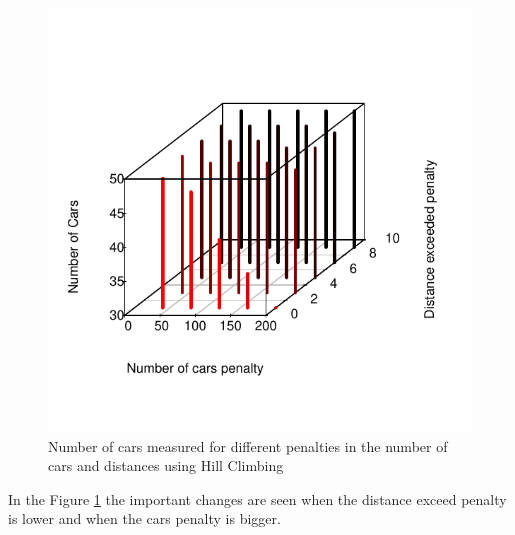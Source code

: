 \documentclass[12]{article}
\begin{document}
\begin{figure}[H]
  \captionsetup{justification=centering}
   \centering
    \includegraphics[scale=0.8]{Results/data_5_2.pdf}
      \caption{Number of cars measured for different penalties in the number of cars and distances using Hill Climbing}
      \label{fig:data_5_2}
  \end{figure}
    \vspace{1cm}

In the Figure \ref{fig:data_5_2} the important changes are seen when the distance exceed penalty is lower and when the cars penalty is bigger. 
\end{document}
